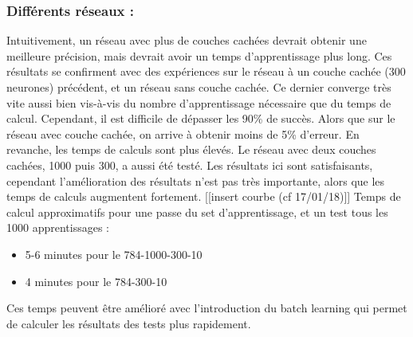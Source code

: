 \subsubsection*{Différents réseaux :} 
Intuitivement, un réseau avec plus de couches cachées devrait obtenir une meilleure précision, mais devrait avoir un temps d’apprentissage plus long. Ces résultats se confirment avec des expériences sur le réseau à un couche cachée (300 neurones) précédent, et un réseau sans couche cachée. Ce dernier converge très vite aussi bien vis-à-vis du nombre d’apprentissage nécessaire que du temps de calcul. Cependant, il est difficile de dépasser les 90\% de succès. Alors que sur le réseau avec couche cachée, on arrive à obtenir moins de 5\% d’erreur. En revanche, les temps de calculs sont plus élevés. Le réseau avec deux couches cachées, 1000 puis 300, a aussi été testé. Les résultats ici sont satisfaisants, cependant l’amélioration des résultats n’est pas très importante, alors que les temps de calculs augmentent fortement.
[[insert courbe (cf 17/01/18)]]
Temps de calcul approximatifs pour une passe du set d’apprentissage, et un test tous les 1000 apprentissages :
\begin{itemize}
	\item 5-6 minutes pour le 784-1000-300-10
	\item 4 minutes pour le 784-300-10 
\end{itemize}
Ces temps peuvent être amélioré avec l’introduction du batch learning qui permet de calculer les résultats des tests plus rapidement.